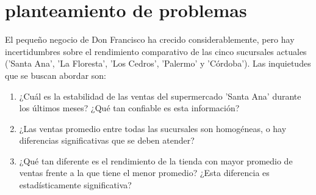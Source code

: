 
\section{planteamiento de problemas}

\begin{flushleft}
    El pequeño negocio de Don Francisco ha crecido considerablemente, pero hay incertidumbres sobre el rendimiento comparativo de las cinco sucursales actuales ('Santa Ana', 'La Floresta', 'Los Cedros', 'Palermo' y 'Córdoba'). Las inquietudes que se buscan abordar son:
\end{flushleft}

\begin{enumerate}
    \item ¿Cuál es la estabilidad de las ventas del supermercado 'Santa Ana' durante los últimos meses? ¿Qué tan confiable es esta información?
    \item ¿Las ventas promedio entre todas las sucursales son homogéneas, o hay diferencias significativas que se deben atender?
    \item ¿Qué tan diferente es el rendimiento de la tienda con mayor promedio de ventas frente a la que tiene el menor promedio? ¿Esta diferencia es estadísticamente significativa?
\end{enumerate}